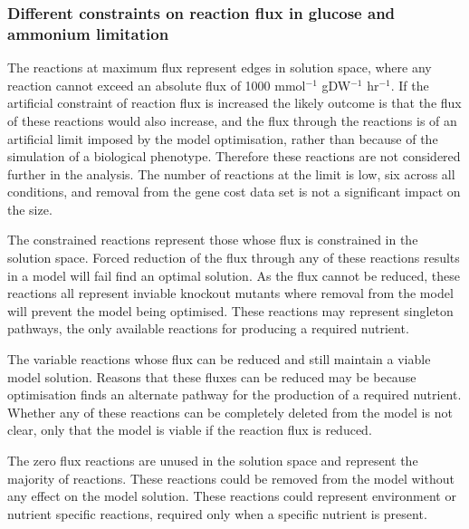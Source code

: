 

\subsubsection{Different constraints on reaction flux in glucose and ammonium limitation}

The reactions at maximum flux represent edges in solution space, where any reaction cannot exceed an absolute flux of 1000 mmol$^{-1}$ gDW$^{-1}$ hr$^{-1}$. If the artificial constraint of reaction flux is increased the likely outcome is that the flux of these reactions would also increase, and the flux through the reactions is of an artificial limit imposed by the model optimisation, rather than because of the simulation of a biological phenotype. Therefore these reactions are not considered further in the analysis. The number of reactions at the limit is low, six across all conditions, and removal from the gene cost data set is not a significant impact on the size.

The constrained reactions represent those whose flux is constrained in the solution space. Forced reduction of the flux through any of these reactions results in a model will fail find an optimal solution. As the flux cannot be reduced, these reactions all represent inviable knockout mutants where removal from the model will prevent the model being optimised. These reactions may represent singleton pathways, the only available reactions for producing a required nutrient.

The variable reactions whose flux can be reduced and still maintain a viable model solution. Reasons that these fluxes can be reduced may be because optimisation finds an alternate pathway for the production of a required nutrient. Whether any of these reactions can be completely deleted from the model is not clear, only that the model is viable if the reaction flux is reduced.

The zero flux reactions are unused in the solution space and represent the majority of reactions. These reactions could be removed from the model without any effect on the model solution. These reactions could represent environment or nutrient specific reactions, required only when a specific nutrient is present.

